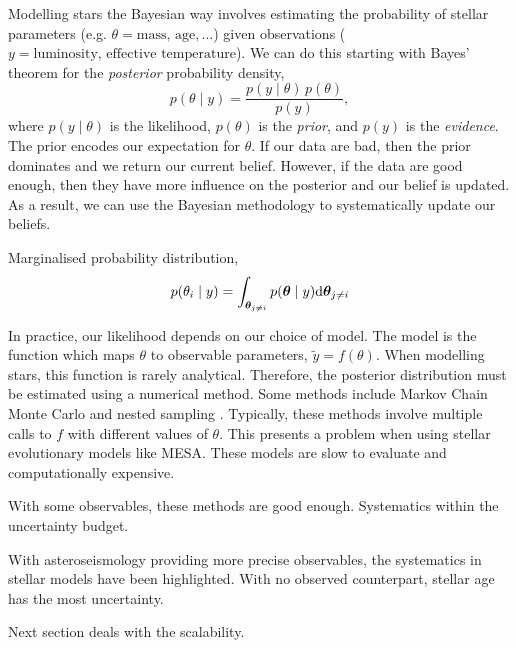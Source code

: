 Modelling stars the Bayesian way involves estimating the probability of stellar parameters (e.g. \(\theta = \text{mass, age}, \dots\)) given observations (\(y = \text{luminosity, effective temperature}\)). We can do this starting with Bayes' theorem for the \emph{posterior} probability density,
%
\begin{equation}
    p(\theta \mid y) = \frac{p(y \mid \theta)\,p(\theta)}{p(y)},
\end{equation}
%
where \(p(y \mid \theta)\) is the likelihood, \(p(\theta)\) is the \emph{prior}, and \(p(y)\) is the \emph{evidence}. The prior encodes our expectation for \(\theta\). If our data are bad, then the prior dominates and we return our current belief. However, if the data are good enough, then they have more influence on the posterior and our belief is updated. As a result, we can use the Bayesian methodology to systematically update our beliefs. 

Marginalised probability distribution,
%
\begin{equation}
    p(\theta_i \mid y) = \int_{\bm{\theta}_{j \neq i}} p(\bm{\theta} \mid y) \mathrm{d} \bm{\theta}_{j \neq i}
\end{equation}
%

In practice, our likelihood depends on our choice of model. The model is the function which maps \(\theta\) to observable parameters, \(\tilde{y} = f(\theta)\). When modelling stars, this function is rarely analytical. Therefore, the posterior distribution must be estimated using a numerical method. Some methods include Markov Chain Monte Carlo and nested sampling \needcite. Typically, these methods involve multiple calls to \(f\) with different values of \(\theta\). This presents a problem when using stellar evolutionary models like MESA. These models are slow to evaluate and computationally expensive.


With some observables, these methods are good enough. Systematics within the uncertainty budget.

With asteroseismology providing more precise observables, the systematics in stellar models have been highlighted. With no observed counterpart, stellar age has the most uncertainty.

Next section deals with the scalability.


